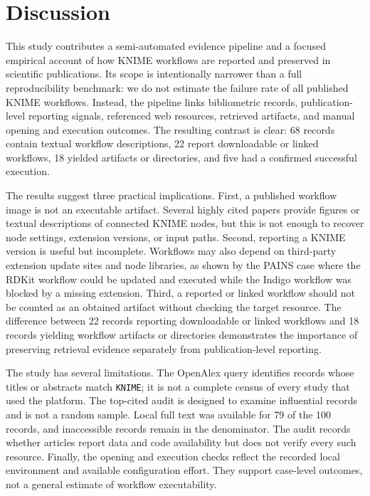 \documentclass[runningheads]{llncs}
\begin{document}
\section{Discussion}

This study contributes a semi-automated evidence pipeline and a focused
empirical account of how KNIME workflows are reported and preserved in
scientific publications. Its scope is intentionally narrower than a full
reproducibility benchmark: we do not estimate the failure rate of all published
KNIME workflows. Instead, the pipeline links bibliometric records,
publication-level reporting signals, referenced web resources, retrieved
artifacts, and manual opening and execution outcomes. The resulting contrast is
clear: 68 records contain textual workflow descriptions, 22 report downloadable
or linked workflows, 18 yielded artifacts or directories, and five had a
confirmed successful execution.

The results suggest three practical implications. First, a published workflow
image is not an executable artifact. Several highly cited papers provide
figures or textual descriptions of connected KNIME nodes, but this is not
enough to recover node settings, extension versions, or input paths. Second,
reporting a KNIME version is useful but incomplete.
Workflows may also depend on third-party extension update sites and node
libraries, as shown by the PAINS case where the RDKit workflow could be
updated and executed while the Indigo workflow was blocked by a missing
extension. Third, a reported or linked workflow should not be counted as an
obtained artifact without checking the target resource. The difference between
22 records reporting downloadable or linked workflows and 18 records yielding
workflow artifacts or directories demonstrates the importance of preserving
retrieval evidence separately from publication-level reporting.

The study has several limitations. The OpenAlex query identifies records whose
titles or abstracts match \texttt{KNIME}; it is not a complete census of every
study that used the platform. The top-cited audit is designed to examine
influential records and is not a random sample. Local full text was available
for 79 of the 100 records, and inaccessible records remain in the denominator.
The audit records whether articles report data and code availability but does
not verify every such resource. Finally, the opening and execution checks
reflect the
recorded local environment and available configuration effort. They support
case-level outcomes, not a general estimate of workflow executability.
\end{document}
